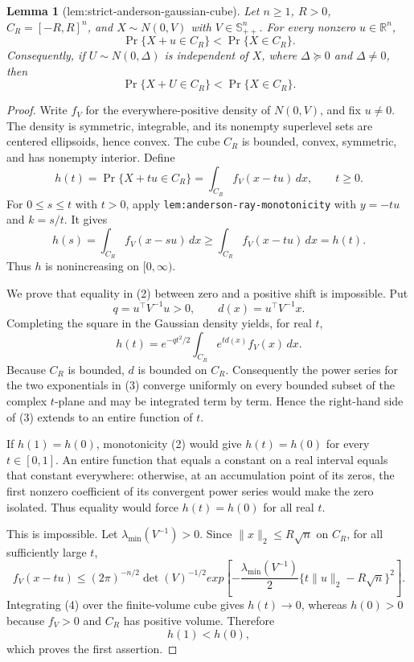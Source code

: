 \documentclass{article}
\newtheorem{lemma}{Lemma}
\begin{document}
\begin{lemma}[lem:strict-anderson-gaussian-cube]\label{lem:strict-anderson-gaussian-cube}
Let \(n\geq1\), \(R>0\), \(C_R=[-R,R]^n\), and \(X\sim N(0,V)\) with \(V\in\mathbb S_{++}^n\).  For every nonzero \(u\in\mathbb R^n\),
\[
 \Pr\{X+u\in C_R\}<\Pr\{X\in C_R\}.
\]
Consequently, if \(U\sim N(0,\Delta)\) is independent of \(X\), where \(\Delta\succeq0\) and \(\Delta\ne0\), then
\[
 \Pr\{X+U\in C_R\}<\Pr\{X\in C_R\}.
\]
\end{lemma}
\begin{proof}
Write \(f_V\) for the everywhere-positive density of \(N(0,V)\), and fix
\(u\ne0\).  The density is symmetric, integrable, and its nonempty
superlevel sets are centered ellipsoids, hence convex.  The cube \(C_R\) is
bounded, convex, symmetric, and has nonempty interior.  Define
\[
 h(t)=\Pr\{X+tu\in C_R\}
     =\int_{C_R}f_V(x-tu)\,dx,
 \qquad t\geq0. \tag{1}
\]
For \(0\leq s\leq t\) with \(t>0\), apply
\texttt{lem:anderson-ray-monotonicity} with \(y=-tu\) and \(k=s/t\).
It gives
\[
 h(s)=\int_{C_R}f_V(x-su)\,dx
 \geq\int_{C_R}f_V(x-tu)\,dx=h(t). \tag{2}
\]
Thus \(h\) is nonincreasing on \([0,\infty)\).

We prove that equality in (2) between zero and a positive shift is
impossible.  Put
\[
 q=u^{\top}V^{-1}u>0,
 \qquad d(x)=u^{\top}V^{-1}x.
\]
Completing the square in the Gaussian density yields, for real \(t\),
\[
 h(t)=e^{-qt^2/2}\int_{C_R}e^{t d(x)}f_V(x)\,dx. \tag{3}
\]
Because \(C_R\) is bounded, \(d\) is bounded on \(C_R\).  Consequently the
power series for the two exponentials in (3) converge uniformly on every
bounded subset of the complex \(t\)-plane and may be integrated term by
term.  Hence the right-hand side of (3) extends to an entire function of
\(t\).

If \(h(1)=h(0)\), monotonicity (2) would give \(h(t)=h(0)\) for every
\(t\in[0,1]\).  An entire function that equals a constant on a real interval
equals that constant everywhere: otherwise, at an accumulation point of its
zeros, the first nonzero coefficient of its convergent power series would
make the zero isolated.  Thus equality would force \(h(t)=h(0)\) for all
real \(t\).

This is impossible.  Let \(\lambda_{\min}(V^{-1})>0\).  Since
\(\lVert x\rVert_2\leq R\sqrt n\) on \(C_R\), for all sufficiently large
\(t\),
\[
 f_V(x-tu)
 \leq (2\pi)^{-n/2}\det(V)^{-1/2}
 exp\!\left[-\frac{\lambda_{\min}(V^{-1})}{2}
       \{t\lVert u\rVert_2-R\sqrt n\}^2\right]. \tag{4}
\]
Integrating (4) over the finite-volume cube gives \(h(t)\to0\), whereas
\(h(0)>0\) because \(f_V>0\) and \(C_R\) has positive volume.  Therefore
\[
 h(1)<h(0), \tag{5}
\]
which proves the first assertion.


\end{proof}
\end{document}
